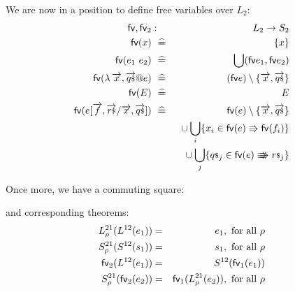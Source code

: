 We are now in a position to define free variables over $L_2$:
\begin{eqnarray*}
   \fv,\fv_2 &:& L_2 \fun S_2
\\ \fv(x) &\defs& \setof x
\\ \fv(e_1~e_2) &\defs& \bigcup( \fv e_1,\fv e_2 )
\\ \fv(\lambda \vec x,\lstvec q @ e) &\defs& (\fv e) \setminus \setof{\vec x,\lstvec q}
\\ \fv(E) &\defs& E
\\ \fv (e[\vec f,\lstvec r/\vec x,\lstvec q])
   &\defs&
   \fv(e)\setminus \setof{\vec x,\lstvec q}
\\ && {} \cup
   \bigcup_i
   \setof{
     x_i \in \fv(e) \sthen \fv(f_i)
   }
\\ && {} \cup
   \bigcup_j
   \setof{
     \lst q_j \in \fv(e) \ssthen \lst r_j
   }
\end{eqnarray*}

Once more, we have a commuting square:
\begin{center}
\end{center}
and corresponding theorems:
\begin{eqnarray}
   L^{21}_\rho(L^{12}(e_1)) &=& e_1, \mbox{ for all }\rho
\\ S^{21}_\rho(S^{12}(s_1)) &=& s_1, \mbox{ for all }\rho
\\ \mathsf{fv}_2(L^{12}(e_1)) &=& S^{12}(\mathsf{fv}_1(e_1))
\\ S^{21}_\rho(\mathsf{fv}_2(e_2)) &=& \mathsf{fv}_1(L^{21}_\rho(e_2)), \mbox{ for all }\rho
\end{eqnarray}

